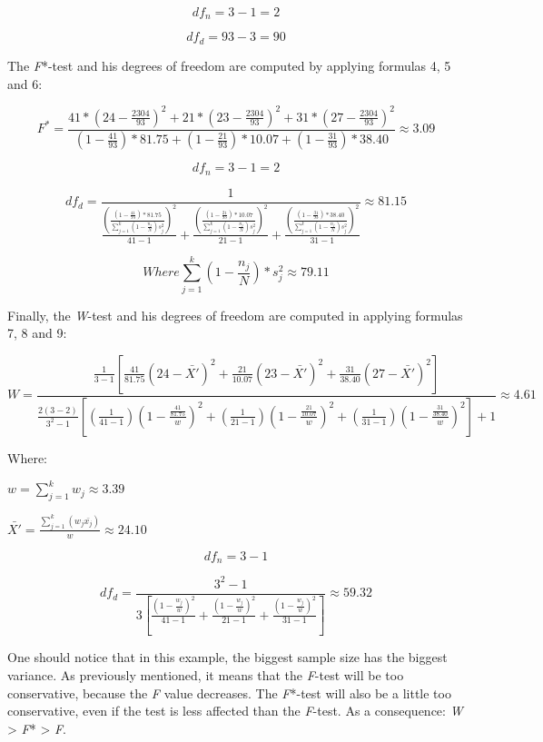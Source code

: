 \documentclass[man,floatsintext]{apa6}
\begin{document}
\begin{appendix}
\[
df_n=3-1=2
\]

\[
df_d=93-3=90
\]

The \emph{F}*-test and his degrees of freedom are computed by applying
formulas 4, 5 and 6:

\[
F^*=\frac{41*(24-\frac{2304}{93})^2+21*(23-\frac{2304}{93})^2+31*(27-\frac{2304}{93})^2}{(1-\frac{41}{93})*81.75+(1-\frac{21}{93})*10.07+(1-\frac{31}{93})*38.40} \approx 3.09
\]

\[
df_n=3-1=2
\]

\[
df_d=\frac{1}{\frac{(\frac{(1-\frac{41}{93})*81.75}{\sum_{j=1}^k(1-\frac{n_j}{N})s_j^2})^2}{41-1}+\frac{(\frac{(1-\frac{21}{93})*10.07}{\sum_{j=1}^k(1-\frac{n_j}{N})s_j^2})^2}{21-1}+\frac{(\frac{(1-\frac{31}{93})*38.40}{\sum_{j=1}^k(1-\frac{n_j}{N})s_j^2})^2}{31-1}} \approx 81.15
\]

\[ Where \sum_{j=1}^k(1-\frac{n_j}{N})*s_j^2 \approx 79.11\]

Finally, the \emph{W}-test and his degrees of freedom are computed in
applying formulas 7, 8 and 9:

\[
W=\frac{\frac{1}{3-1}[\frac{41}{81.75}(24-\bar{X'})^2+\frac{21}{10.07}(23-\bar{X'})^2+\frac{31}{38.40}(27-\bar{X'})^2]}
{\frac{2(3-2)}{3^2-1}[(\frac{1}{41-1})(1-\frac{\frac{41}{81.75}}{w})^2+(\frac{1}{21-1})(1-\frac{\frac{21}{10.07}}{w})^2+(\frac{1}{31-1})(1-\frac{\frac{31}{38.40}}{w})^2]+1} \approx 4.61
\]

Where:

\(w=\sum_{j=1}^k w_j \approx 3.39\)

\(\bar{X'}=\frac{\sum_{j=1}^k (w_j\bar{x_j})}{w} \approx 24.10\)

\[
df_n=3-1
\]

\[
df_d=\frac{3^2-1}{3[\frac{(1-\frac{w_j}{w})^2}{41-1}+\frac{(1-\frac{w_j}{w})^2}{21-1}+\frac{(1-\frac{w_j}{w})^2}{31-1}]} \approx 59.32
\]

One should notice that in this example, the biggest sample size has the
biggest variance. As previously mentioned, it means that the
\emph{F}-test will be too conservative, because the \emph{F} value
decreases. The \emph{F}*-test will also be a little too conservative,
even if the test is less affected than the \emph{F}-test. As a
consequence: \emph{W} \textgreater{} \emph{F}* \textgreater{} \emph{F}.
\end{appendix}
\end{document}

